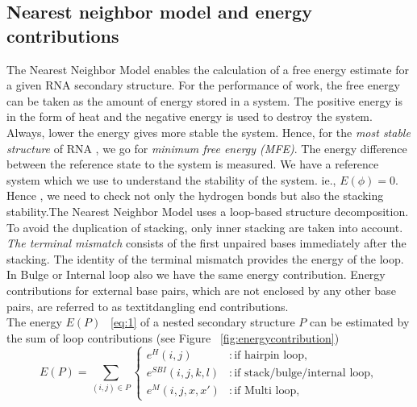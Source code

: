 \documentclass[twoside,a4paper]{report}
\begin{document}
 	 \subsection{Nearest neighbor model and energy contributions }
 	 
 	 The Nearest Neighbor Model enables the calculation of a free energy estimate for a given RNA secondary structure. For the performance of work, the free energy can be taken as the amount of energy stored in a system. The positive energy is in the form of heat  and the negative energy is used to destroy the system. Always, lower the energy gives more stable the system. Hence, for the \textit{most stable structure} of RNA , we go for \textit{minimum free energy (MFE)}. The energy difference between the reference state to the system is measured. We have a reference system which we use to understand the stability of the system. ie., $ E(\phi) =0 $. Hence , we need to check not only the hydrogen bonds but also the stacking stability.The Nearest Neighbor Model uses a loop-based structure decomposition. To avoid the duplication of stacking, only inner stacking are taken into account. \\
 	 
 	 \textit{The terminal mismatch} consists of the first unpaired bases immediately after the stacking. The identity of the terminal mismatch provides the energy of the loop. In Bulge or Internal loop also we have the same energy contribution. Energy contributions for external base pairs, which are not enclosed by any other base pairs, are referred to as textit{dangling end contributions}.\\ 
 	 The energy $E(P)$ ~\ref{eq:1} of a nested secondary structure $P$ can be estimated by the sum of loop contributions (see Figure ~\ref{fig:energycontribution})\\
 	 
 	 \begin{equation}
 	 \label{eq:1}
 	 E(P) = \sum_{(i,j) \in P} \begin{cases}
 	 e^H(i,j) & : \text{if hairpin loop}, \\
 	 e^{SBI}(i,j,k,l) & : \text{if stack/bulge/internal loop} ,\\
 	 e^M(i,j,x,x') & : \text{if Multi loop},
 	 \end{cases}
 	 \end{equation}
 	 
\end{document}
